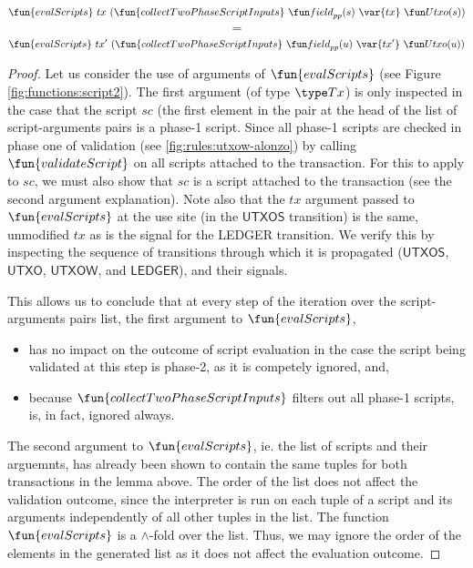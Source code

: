 \begin{property}
\begin{corollary}
  \[\fun{evalScripts}~{tx}~ (\fun{collectTwoPhaseScriptInputs} ~\field_{pp}(s)~\var{tx}~ \Utxo(s))\]
  \[ = \]
  \[\fun{evalScripts}~{tx'}~ (\fun{collectTwoPhaseScriptInputs} ~\field_{pp}(u)~\var{tx'}~ \Utxo(u))\]

\end{corollary}

\begin{proof}
  Let us consider the use of arguments of $\fun{evalScripts}$ (see Figure \ref{fig:functions:script2}).
  The first argument (of type $\Tx$) is only inspected in the case that the script $sc$ (the first element
    in the pair at the head of the list of script-arguments pairs is a phase-1 script. Since all phase-1 scripts
    are checked in phase one of validation (see \ref{fig:rules:utxow-alonzo}) by calling $\fun{validateScript}$
    on all scripts attached to the transaction. For this to apply to $sc$, we must also show
    that $sc$ is a script attached to the transaction (see the second argument explanation).
    Note also that the $tx$ argument passed to $\fun{evalScripts}$ at the use site (in the $\mathsf{UTXOS}$ transition)
    is the same, unmodified $tx$ as is the signal for the LEDGER transition. We verify this by inspecting
    the sequence of transitions through which it is propagated
    ($\mathsf{UTXOS}$, $\mathsf{UTXO}$, $\mathsf{UTXOW}$, and $\mathsf{LEDGER}$), and their signals.

    This allows us to conclude that at every step of the iteration over the script-arguments pairs list,
    the first argument to $\fun{evalScripts}$,

    \begin{itemize}
      \item has no impact on the outcome of script evaluation in the case the script
      being validated at this step is phase-2, as it is competely ignored, and,

      \item because $\fun{collectTwoPhaseScriptInputs}$ filters out all phase-1 scripts,
      is, in fact, ignored always.
    \end{itemize}

    The second argument to $\fun{evalScripts}$, ie. the list of scripts and their arguemnts,
    has already been shown to contain the same tuples for both transactions in the lemma above.
    The order of the list does not affect the validation outcome, since the interpreter is run
    on each tuple of a script and its arguments independently of all other tuples in the list.
    The function $\fun{evalScripts}$ is a $\wedge$-fold over the list. Thus, we may ignore the order
    of the elements in the generated list as it does not affect the evaluation outcome.


\end{proof}
\end{property}
